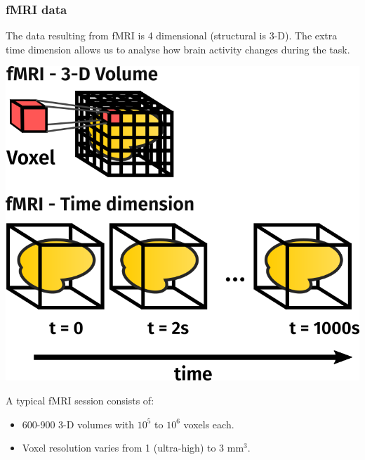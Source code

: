 \documentclass[11pt]{beamer}
\begin{document}
\begin{frame}
    \frametitle{fMRI data}

    The data resulting from fMRI is 4 dimensional (structural is 3-D). The extra
    time dimension allows us to analyse how brain activity changes during the
    task.

    \vspace*{-0.25cm}

    \begin{center}
        \includegraphics[scale=0.25]{figures/4d_data.png}
    \end{center}

    \vspace*{-0.6cm}

    A typical fMRI session consists of:
    \begin{itemize}
        \item 600-900 3-D volumes with $10^5$ to $10^6$ voxels each.
        \item Voxel resolution varies from 1 (ultra-high) to 3 mm$^3$.
    \end{itemize}

\end{frame}
\end{document}
